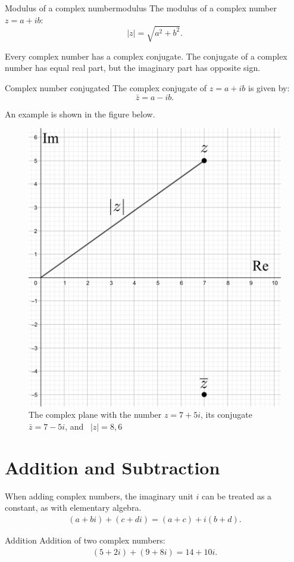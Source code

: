 \begin{definition}{Modulus of a complex number}{modulus}
The modulus of a complex number $z=a+ib$:
$$\mid z\mid=\sqrt{a^2+b^2}.$$
\end{definition}
\noindent
Every complex number has a complex conjugate. The conjugate of a complex number has equal real part, but the imaginary part has opposite sign.

\begin{definition}{Complex number conjugated}{}
The complex conjugate of $z=a+ib$ is given by:
$$\bar{z}=a-ib.$$
\end{definition}

\noindent An example is shown in the figure below.  

\begin{figure}[H]
\centering
\includegraphics[scale=0.2]{fig/img/complex_plan}
\caption{The complex plane with the number $z=7+5i$, its conjugate $\bar{z}=7-5i$, and \  $|z|=8,6$}
\end{figure}


\section{Addition and Subtraction}
When adding complex numbers, the imaginary unit $i$ can be treated as a constant, as with elementary algebra.
\begin{align*}
(a + bi) + (c + di) = (a + c) + i(b + d).
\end{align*} 
\begin{example}{Addition}{}
Addition of two complex numbers:
\begin{align*}
(5+2i)+(9+8i)=14+10i.
\end{align*}
\end{example}


